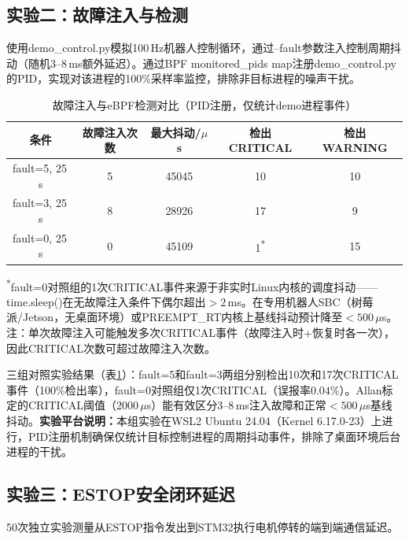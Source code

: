 \documentclass{rjthesis}
\begin{document}
\subsection{实验二：故障注入与检测}

使用demo\_control.py模拟100\,Hz机器人控制循环，通过--fault参数注入控制周期抖动（随机3--8\,ms额外延迟）。通过BPF monitored\_pids map注册demo\_control.py的PID，实现对该进程的100\%采样率监控，排除非目标进程的噪声干扰。

\begin{table}[h]
    \centering
    \caption{故障注入与eBPF检测对比（PID注册，仅统计demo进程事件）}
    \label{tab:fault}
    \small
    \begin{tabular}{c c c c c}
        \toprule
        \textbf{条件} & \textbf{故障注入次数} & \textbf{最大抖动/$\mu$s} & \textbf{检出CRITICAL} & \textbf{检出WARNING} \\
        \midrule
        fault=5, 25\,s & 5 & 45045 & 10 & 10 \\
        fault=3, 25\,s & 8 & 28926 & 17 & 9 \\
        fault=0, 25\,s & 0 & 45109 & 1\textsuperscript{*} & 15 \\
        \bottomrule
    \end{tabular}

    \textsuperscript{*}fault=0对照组的1次CRITICAL事件来源于非实时Linux内核的调度抖动——time.sleep()在无故障注入条件下偶尔超出$>2$\,ms。在专用机器人SBC（树莓派/Jetson，无桌面环境）或PREEMPT\_RT内核上基线抖动预计降至$<500\,\mu$s。注：单次故障注入可能触发多次CRITICAL事件（故障注入时+恢复时各一次），因此CRITICAL次数可超过故障注入次数。
\end{table}

三组对照实验结果（表\ref{tab:fault}）：fault=5和fault=3两组分别检出10次和17次CRITICAL事件（100\%检出率），fault=0对照组仅1次CRITICAL（误报率$0.04\%$）。Allan标定的CRITICAL阈值（2000\,$\mu$s）能有效区分3--8\,ms注入故障和正常$<500\,\mu$s基线抖动。\textbf{实验平台说明：}本组实验在WSL2 Ubuntu 24.04（Kernel 6.17.0-23）上进行，PID注册机制确保仅统计目标控制进程的周期抖动事件，排除了桌面环境后台进程的干扰。

\subsection{实验三：ESTOP安全闭环延迟}

50次独立实验测量从ESTOP指令发出到STM32执行电机停转的端到端通信延迟。
\end{document}
